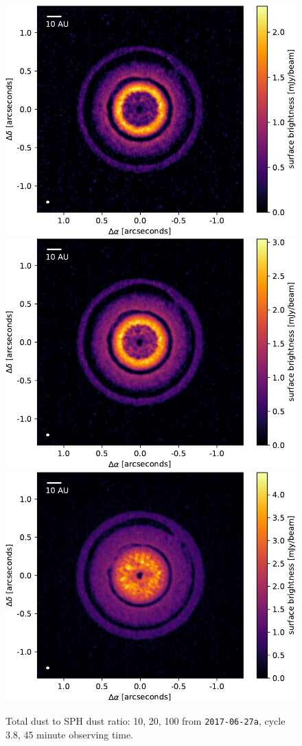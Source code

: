 \documentclass[usenatbib,a4paper,times,fleqn]{mnras}
\begin{document}
\begin{figure}
   \begin{center}
      \includegraphics[width=0.32\columnwidth]{figs/total-to-SPH-dust_10.pdf}
      \includegraphics[width=0.32\columnwidth]{figs/total-to-SPH-dust_20.pdf}
      \includegraphics[width=0.32\columnwidth]{figs/total-to-SPH-dust_100.pdf}
      \caption{Total dust to SPH dust ratio: 10, 20, 100 from
         \texttt{2017-06-27a}, cycle 3.8, 45 minute observing time.}
      \label{fig:sph-dust-mass}
   \end{center}
\end{figure}
\end{document}
